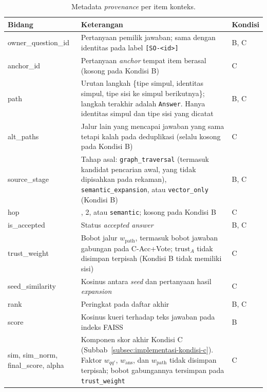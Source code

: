 \begin{table}[!htbp]
\centering
\small
\caption{Metadata \emph{provenance} per item konteks.}
\label{tab:field-provenance}
\renewcommand{\arraystretch}{1.2}
\begin{tabularx}{\textwidth}{|>{\ttfamily\raggedright\arraybackslash}p{3.4cm}|>{\raggedright\arraybackslash}X|>{\raggedright\arraybackslash}p{1.6cm}|}
\hline
\textbf{\rmfamily Bidang} & \textbf{\rmfamily Keterangan} & \textbf{\rmfamily Kondisi} \\
\hline
owner\_question\_id & Pertanyaan pemilik jawaban; sama dengan identitas pada label \texttt{[SO-<id>]} & B, C \\
\hline
anchor\_id & Pertanyaan \emph{anchor} tempat item berasal (kosong pada Kondisi B) & C \\
\hline
path & Urutan langkah \{tipe simpul, identitas simpul, tipe sisi ke simpul berikutnya\}; langkah terakhir adalah \texttt{Answer}. Hanya identitas simpul dan tipe sisi yang dicatat & B, C \\
\hline
alt\_paths & Jalur lain yang mencapai jawaban yang sama tetapi kalah pada deduplikasi (selalu kosong pada Kondisi B) & C \\
\hline
source\_stage & Tahap asal: \texttt{graph\_traversal} (termasuk kandidat pencarian awal, yang tidak dipisahkan pada rekaman), \texttt{semantic\_expansion}, atau \texttt{vector\_only} (Kondisi B) & B, C \\
\hline
hop & 1, 2, atau \texttt{semantic}; kosong pada Kondisi B & C \\
\hline
is\_accepted & Status \emph{accepted answer} & B, C \\
\hline
trust\_weight & Bobot jalur $w_{\mathrm{path}}$, termasuk bobot jawaban gabungan pada C-Acc+Vote; $\mathrm{trust}_A$ tidak disimpan terpisah (Kondisi B tidak memiliki sisi) & C \\
\hline
seed\_similarity & Kosinus antara \emph{seed} dan pertanyaan hasil \emph{expansion} & C \\
\hline
rank & Peringkat pada daftar akhir & B, C \\
\hline
score & Kosinus kueri terhadap teks jawaban pada indeks FAISS & B \\
\hline
sim, sim\_norm, final\_score, alpha & Komponen skor akhir Kondisi C (Subbab~\ref{subsec:implementasi-kondisi-c}). Faktor $w_{qq'}$, $w_{\mathrm{ans}}$, dan $w_{\mathrm{path}}$ tidak disimpan terpisah; bobot gabungannya tersimpan pada \texttt{trust\_weight} & C \\
\hline
\end{tabularx}\\
\end{table}

